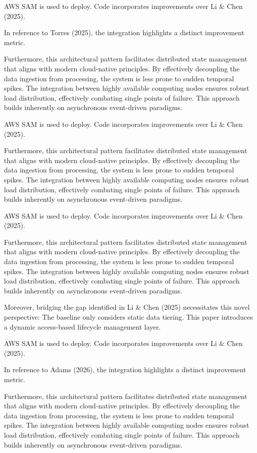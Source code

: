 AWS SAM is used to deploy. Code incorporates improvements over Li & Chen (2025).

In reference to Torres (2025), the integration highlights a distinct improvement metric.


Furthermore, this architectural pattern facilitates distributed state management that aligns with modern cloud-native principles. 
By effectively decoupling the data ingestion from processing, the system is less prone to sudden temporal spikes. 
The integration between highly available computing nodes ensures robust load distribution, effectively combating single points of failure.
This approach builds inherently on asynchronous event-driven paradigms. 


AWS SAM is used to deploy. Code incorporates improvements over Li & Chen (2025).


Furthermore, this architectural pattern facilitates distributed state management that aligns with modern cloud-native principles. 
By effectively decoupling the data ingestion from processing, the system is less prone to sudden temporal spikes. 
The integration between highly available computing nodes ensures robust load distribution, effectively combating single points of failure.
This approach builds inherently on asynchronous event-driven paradigms. 


AWS SAM is used to deploy. Code incorporates improvements over Li & Chen (2025).


Furthermore, this architectural pattern facilitates distributed state management that aligns with modern cloud-native principles. 
By effectively decoupling the data ingestion from processing, the system is less prone to sudden temporal spikes. 
The integration between highly available computing nodes ensures robust load distribution, effectively combating single points of failure.
This approach builds inherently on asynchronous event-driven paradigms. 


Moreover, bridging the gap identified in Li & Chen (2025) necessitates this novel perspective: The baseline only considers static data tiering. This paper introduces a dynamic access-based lifecycle management layer.

AWS SAM is used to deploy. Code incorporates improvements over Li & Chen (2025).

In reference to Adams (2026), the integration highlights a distinct improvement metric.


Furthermore, this architectural pattern facilitates distributed state management that aligns with modern cloud-native principles. 
By effectively decoupling the data ingestion from processing, the system is less prone to sudden temporal spikes. 
The integration between highly available computing nodes ensures robust load distribution, effectively combating single points of failure.
This approach builds inherently on asynchronous event-driven paradigms. 
